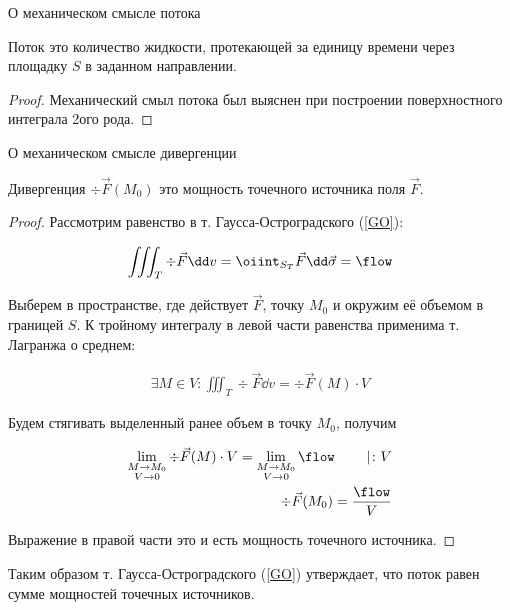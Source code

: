 
\begin{theorem}
  О механическом смысле потока

  Поток это количество жидкости, протекающей за единицу времени через площадку
  \(S\) в заданном направлении.
\end{theorem}
\begin{proof}
  Механический смыл потока был выяснен при построении поверхностного интеграла
  2ого рода.
\end{proof}

\begin{theorem}
  О механическом смысле дивергенции

  Дивергенция \(\div \vec{F}(M_{0})\) это мощность точечного источника поля
  \(\vec{F}\).
\end{theorem}
\begin{proof}
  Рассмотрим равенство в т. Гаусса-Остроградского (\ref{GO}):

  \begin{align*}
    \iiint_{T} \div \vec{F} \dd v
    = \oiint_{S_{T}} \vec{F} \dd \vec{\sigma}
    = \flow
  \end{align*}

  Выберем в пространстве, где действует \(\vec{F}\), точку \(M_{0}\) и окружим
  её объемом в границей \(S\). К тройному интегралу в левой части равенства
  применима т. Лагранжа о среднем:

  \begin{align*}
    \exists M \in V \colon
      \iiint_{T} \div \vec{F} \dd v = \div \vec{F}(M) \cdot V
  \end{align*}

  Будем стягивать выделенный ранее объем в точку \(M_{0}\), получим

  \begin{align*}
    \lim_{\substack{M \to M_{0} \\ V \to 0}}
      \div \vec{F}(M) \cdot V = 
    \lim_{\substack{M \to M_{0} \\ V \to 0}}
      \flow
    \hspace{20pt} \mid \colon V
    \\
    \div \vec{F}(M_{0}) = \frac{\flow}{V}
  \end{align*}

  Выражение в правой части это и есть мощность точечного источника.
\end{proof}

\begin{corollary}
  Таким образом т. Гаусса-Остроградского (\ref{GO}) утверждает, что поток равен
  сумме мощностей точечных источников.
\end{corollary}